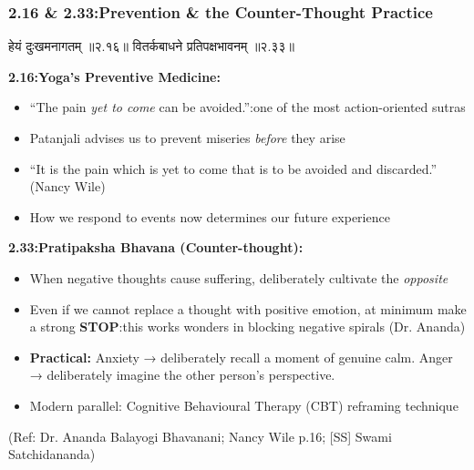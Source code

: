 \begin{frame}[fragile]\frametitle{2.16 \& 2.33:Prevention \& the Counter-Thought Practice}

\begin{sanskrit}
हेयं दुःखमनागतम् ॥२.१६॥
वितर्कबाधने प्रतिपक्षभावनम् ॥२.३३॥
\end{sanskrit}

\textbf{2.16:Yoga's Preventive Medicine:}
\begin{itemize}
\item ``The pain \emph{yet to come} can be avoided.'':one of the most action-oriented sutras
\item Patanjali advises us to prevent miseries \emph{before} they arise
\item ``It is the pain which is yet to come that is to be avoided and discarded.'' (Nancy Wile)
\item How we respond to events now determines our future experience
\end{itemize}

\textbf{2.33:Pratipaksha Bhavana (Counter-thought):}
\begin{itemize}
\item When negative thoughts cause suffering, deliberately cultivate the \emph{opposite}
\item Even if we cannot replace a thought with positive emotion, at minimum make a strong \textbf{STOP}:this works wonders in blocking negative spirals (Dr. Ananda)
\item \textbf{Practical:} Anxiety → deliberately recall a moment of genuine calm. Anger → deliberately imagine the other person's perspective.
\item Modern parallel: Cognitive Behavioural Therapy (CBT) reframing technique
\end{itemize}

\tiny{(Ref: Dr. Ananda Balayogi Bhavanani; Nancy Wile p.16; [SS] Swami Satchidananda)}

\end{frame}

